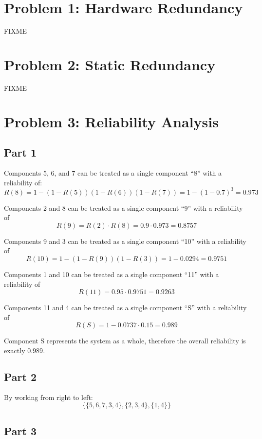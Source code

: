 \documentclass[a4paper,parskip,headheight=38pt]{scrartcl} %
\begin{document}
\section*{Problem 1: Hardware Redundancy}

FIXME


\section*{Problem 2: Static Redundancy}

FIXME


\section*{Problem 3: Reliability Analysis}

\subsection*{Part 1}

Components 5, 6, and 7 can be treated as a single component \enquote{8} with a reliability of:
\[R(8) = 1 - (1 - R(5))(1 - R(6))(1 - R(7)) = 1 - (1-0.7)^3 = 0.973\]

Components 2 and 8 can be treated as a single component \enquote{9} with a reliability of
\[R(9) = R(2) \cdot R(8) = 0.9 \cdot 0.973 = 0.8757\]

Components 9 and 3 can be treated as a single component \enquote{10} with a reliability of
\[R(10) = 1 - (1 - R(9))(1 - R(3)) = 1 - 0.0294 = 0.9751\]

Components 1 and 10 can be treated as a single component \enquote{11} with a reliability of
\[R(11) = 0.95 \cdot 0.9751 = 0.9263\]

Components 11 and 4 can be treated as a single component \enquote{S} with a reliability of
\[R(S) = 1 - 0.0737 \cdot 0.15 = 0.989\]

Component S represents the system as a whole, therefore the overall reliability is exactly $0.989$.

\subsection*{Part 2}

By working from right to left:
\[\{  \{5,6,7,3,4\}, \{2,3,4\}, \{1,4\}  \}\]

\subsection*{Part 3}
\end{document}
